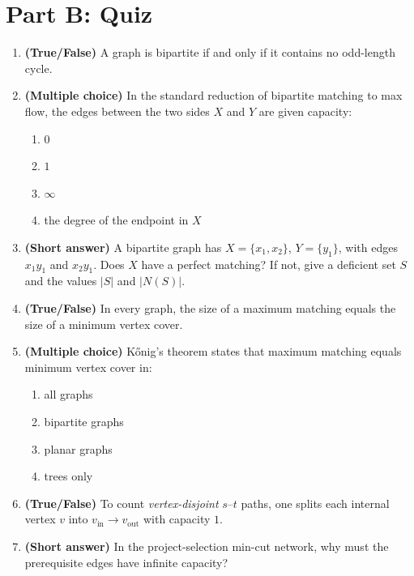 \documentclass[11pt]{article}
\begin{document}
\newpage
\section*{Part B: Quiz}

\begin{enumerate}[label=\textbf{B\arabic*.}, leftmargin=2.2em]

\item \textbf{(True/False)} A graph is bipartite if and only if it contains no
odd-length cycle.

\item \textbf{(Multiple choice)} In the standard reduction of bipartite matching
to max flow, the edges between the two sides $X$ and $Y$ are given capacity:
\begin{enumerate}[label=(\alph*)]
    \item $0$
    \item $1$
    \item $\infty$
    \item the degree of the endpoint in $X$
\end{enumerate}

\item \textbf{(Short answer)} A bipartite graph has $X = \{x_1, x_2\}$,
$Y = \{y_1\}$, with edges $x_1 y_1$ and $x_2 y_1$. Does $X$ have a perfect
matching? If not, give a deficient set $S$ and the values $|S|$ and $|N(S)|$.

\item \textbf{(True/False)} In every graph, the size of a maximum matching equals
the size of a minimum vertex cover.

\item \textbf{(Multiple choice)} K\H{o}nig's theorem states that maximum matching
equals minimum vertex cover in:
\begin{enumerate}[label=(\alph*)]
    \item all graphs
    \item bipartite graphs
    \item planar graphs
    \item trees only
\end{enumerate}

\item \textbf{(True/False)} To count \emph{vertex-disjoint} $s$--$t$ paths, one
splits each internal vertex $v$ into $v_{\text{in}} \to v_{\text{out}}$ with
capacity $1$.

\item \textbf{(Short answer)} In the project-selection min-cut network, why must
the prerequisite edges have infinite capacity?


\end{enumerate}
\end{document}
